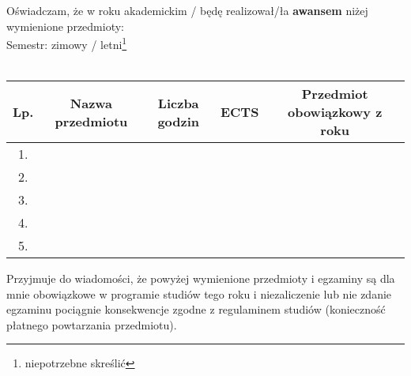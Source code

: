 \documentclass{wmiisubmission}
\begin{document}
\cracowdate
{}
\studentaddress
\addressee{\piotrniemiec}

\vskip 1.6cm

Oświadczam, że w roku akademickim \fillField{1cm}/\fillField{1cm} będę realizował/ła
\textbf{awansem} niżej\\
wymienione przedmioty:\\

\noindent
Semestr: zimowy / letni\footnote[1]{niepotrzebne skreślić}\\\\

\begin{tabular}{|c|c|c|c|c|}

    \hline
    \textbf{Lp.} & \textbf{Nazwa przedmiotu} \hspace{0.9cm} & \small{\textbf{Liczba godzin}} & \textbf{ECTS} & \small{\textbf{Przedmiot obowiązkowy z roku}} \\
    \hline
    1.  &   &   &  &\\
    \hline
    2.  &   &   &  &\\
    \hline
    3.  &   &   &  &\\
    \hline
    4.  &   &   &  &\\
    \hline
    5.  &   &   &  &\\
    \hline

\end{tabular}

\vskip 1.4cm

Przyjmuje do wiadomości, że powyżej wymienione przedmioty i egzaminy są dla mnie
obowiązkowe w programie studiów tego roku i niezaliczenie lub nie zdanie egzaminu
pociągnie konsekwencje zgodne z regulaminem studiów (konieczność płatnego
powtarzania przedmiotu).

\vskip 0.6cm

\studentsignature

\vskip 1.0cm

\end{document}
